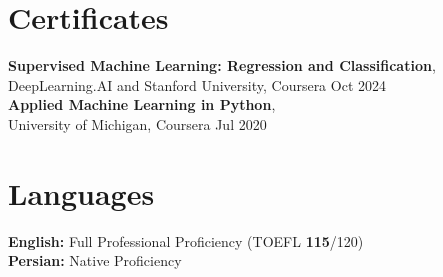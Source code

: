 \documentclass[a4paper,10pt]{article}
\newcommand{\resumeItem}[1]{\item #1}
\newcommand{\resumeSubheading}[4]{
    \textbf{#1} \hfill #2 \\
    \textit{#3} \hfill \textit{#4}
}
\begin{document}






\section*{Certificates}

\textbf{Supervised Machine Learning: Regression and Classification},\\
DeepLearning.AI and Stanford University, Coursera
\hfill Oct 2024 \\
\textbf{Applied Machine Learning in Python},\\
University of Michigan, Coursera
\hfill Jul 2020


\section*{Languages}

\textbf{English:} Full Professional Proficiency (TOEFL \textbf{115}/120) \\
\textbf{Persian:} Native Proficiency
\end{document}
